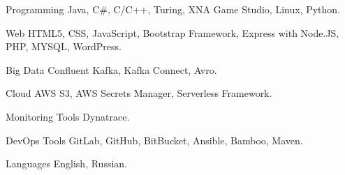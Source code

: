 


\begin{cvskills}


\cvskill
{Programming} %
{Java, C\#, C/C++, Turing, XNA Game Studio, Linux, Python.} %


\cvskill
{Web} %
{HTML5, CSS, JavaScript, Bootstrap Framework, Express with Node.JS, PHP, MYSQL, WordPress.} %


\cvskill
{Big Data} %
{Confluent Kafka, Kafka Connect, Avro.} %

\cvskill
{Cloud} %
{AWS S3, AWS Secrets Manager, Serverless Framework.} %

\cvskill
{Monitoring Tools} %
{Dynatrace.} %

\cvskill
{DevOps Tools} %
{GitLab, GitHub, BitBucket, Ansible, Bamboo, Maven.} %

\cvskill
{Languages} %
{English, Russian.} %


\end{cvskills}